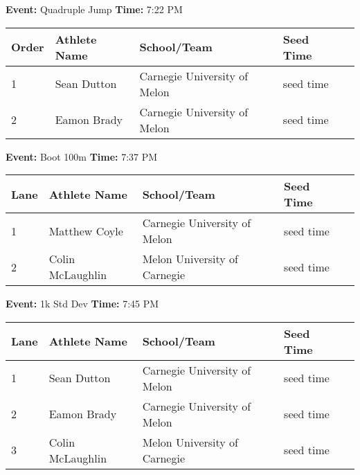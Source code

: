 \documentclass[11pt]{article}
\begin{document}
\textbf{Event:} Quadruple Jump \quad \textbf{Time:} 7:22 PM 

\vspace{1em}
\begin{tabular}{@{}lllll@{}}
\toprule
\textbf{Order} & \textbf{Athlete Name} & \textbf{School/Team} & \textbf{Seed Time} \\
\midrule
1 & Sean Dutton & Carnegie University of Melon & seed time &\\
2 & Eamon Brady & Carnegie University of Melon & seed time &\\
\bottomrule
\end{tabular}
\vspace{2.5em}


\textbf{Event:} Boot 100m \quad \textbf{Time:} 7:37 PM 

\vspace{1em}
\begin{tabular}{@{}lllll@{}}
\toprule
\textbf{Lane} & \textbf{Athlete Name} & \textbf{School/Team} & \textbf{Seed Time} \\
\midrule
1 & Matthew Coyle & Carnegie University of Melon & seed time &\\
2 & Colin McLaughlin & Melon University of Carnegie & seed time &\\
\bottomrule
\end{tabular}
\vspace{2.5em}


\textbf{Event:} 1k Std Dev \quad \textbf{Time:} 7:45 PM 

\vspace{1em}
\begin{tabular}{@{}lllll@{}}
\toprule
\textbf{Lane} & \textbf{Athlete Name} & \textbf{School/Team} & \textbf{Seed Time} \\
\midrule
1 & Sean Dutton & Carnegie University of Melon & seed time &\\
2 & Eamon Brady & Carnegie University of Melon & seed time &\\
3 & Colin McLaughlin & Melon University of Carnegie & seed time &\\
\bottomrule
\end{tabular}
\vspace{2.5em}
\end{document}
